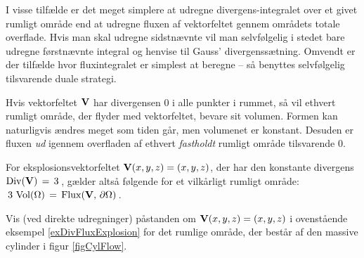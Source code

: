 \begin{think}
I visse tilfælde er det meget simplere at udregne divergens-integralet over et givet rumligt område
end at udregne fluxen  af vektorfeltet gennem områdets totale overflade.
Hvis man skal udregne sidstnævnte vil man selvfølgelig i stedet bare udregne førstnævnte integral og henvise til
Gauss' divergenssætning. Omvendt er der tilfælde hvor fluxintegralet er simplest at beregne -- så benyttes selvfølgelig tilsvarende duale  strategi.
\end{think}





\begin{example}
Hvis vektorfeltet ${\bf{V}}$ har divergensen $0$
i alle punkter i rummet, så vil ethvert rumligt
område, der flyder med vektorfeltet, bevare sit
volumen. Formen kan naturligvis ændres meget som
tiden går, men volumenet er konstant. Desuden er
fluxen {\em{ud}} igennem overfladen af ethvert
{\em{fastholdt}} rumligt område tilsvarende $0$.
\end{example}



\begin{example} \label{exDivFluxExplosion}
For eksplosionsvektorfeltet ${\bf{V}}(x,y,z) = (x,y,z)$, der har
den konstante divergens $\operatorname{Div}({\bf{V}}) \, = \, 3\,$, gælder altså
følgende for et vilkårligt rumligt område: $ \, 3\,\operatorname{Vol}(\Omega) \, =
\, \operatorname{Flux}({\bf{V}}, \, \partial \Omega)\, $.
\end{example}



\begin{exercise}
Vis (ved direkte udregninger) påstanden om
${\bf{V}}(x,y,z) = (x,y,z)$ i ovenstående eksempel
\ref{exDivFluxExplosion} for det rumlige område, der består af den
massive cylinder i figur \ref{figCylFlow}.
\end{exercise}




